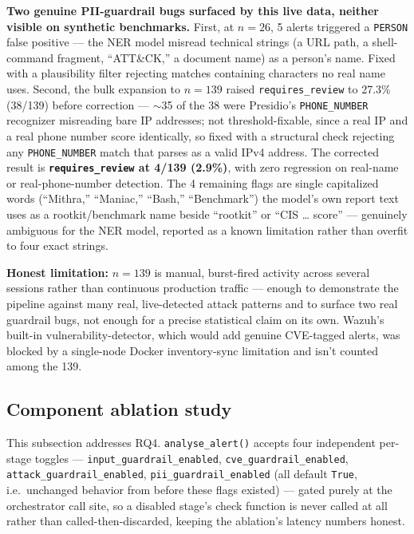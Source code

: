 \documentclass[pdflatex,sn-mathphys-num]{sn-jnl}%
\begin{document}
\textbf{Two genuine PII-guardrail bugs surfaced by this live data,
neither visible on synthetic benchmarks.} First, at $n=26$, 5 alerts
triggered a \texttt{PERSON} false positive --- the NER model misread
technical strings (a URL path, a shell-command fragment, ``ATT\&CK,'' a
document name) as a person's name. Fixed with a plausibility filter
rejecting matches containing characters no real name uses. Second, the
bulk expansion to $n=139$ raised \texttt{requires\_review} to 27.3\%
(38/139) before correction --- $\sim$35 of the 38 were Presidio's
\texttt{PHONE\_NUMBER} recognizer misreading bare IP addresses; not
threshold-fixable, since a real IP and a real phone number score
identically, so fixed with a structural check rejecting any
\texttt{PHONE\_NUMBER} match that parses as a valid IPv4 address. The
corrected result is \textbf{\texttt{requires\_review} at 4/139 (2.9\%)},
with zero regression on real-name or real-phone-number detection. The 4
remaining flags are single capitalized words (``Mithra,'' ``Maniac,''
``Bash,'' ``Benchmark'') the model's own report text uses as a
rootkit/benchmark name beside ``rootkit'' or ``CIS \ldots{} score'' ---
genuinely ambiguous for the NER model, reported as a known limitation
rather than overfit to four exact strings.

\textbf{Honest limitation:} $n=139$ is manual, burst-fired activity
across several sessions rather than continuous production traffic ---
enough to demonstrate the pipeline against many real, live-detected
attack patterns and to surface two real guardrail bugs, not enough for a
precise statistical claim on its own. Wazuh's built-in
vulnerability-detector, which would add genuine CVE-tagged alerts, was
blocked by a single-node Docker inventory-sync limitation and isn't
counted among the 139.

\subsection{Component ablation study}\label{subsec:ablation}

This subsection addresses RQ4. \texttt{analyse\_alert()} accepts four
independent per-stage toggles ---
\texttt{input\_guardrail\_enabled}, \texttt{cve\_guardrail\_enabled},
\texttt{attack\_guardrail\_enabled}, \texttt{pii\_guardrail\_enabled}
(all default \texttt{True}, i.e.\ unchanged behavior from before these
flags existed) --- gated purely at the orchestrator call site, so a
disabled stage's check function is never called at all rather than
called-then-discarded, keeping the ablation's latency numbers honest.
\end{document}

